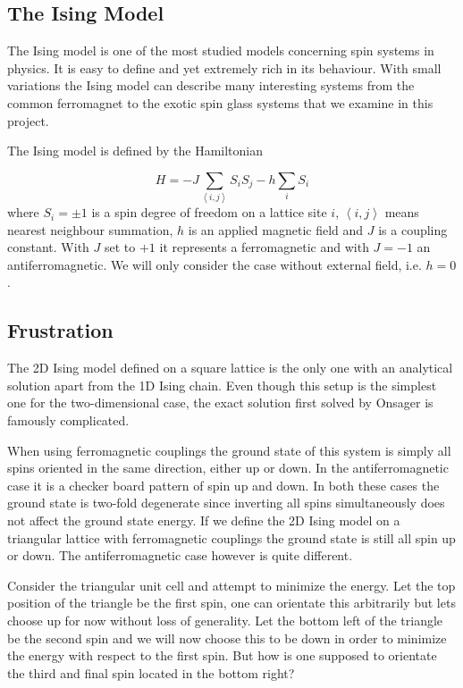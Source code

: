 \documentclass[paper=a4, fontsize=11pt]{scrartcl} %
\numberwithin{equation}{section} %
\numberwithin{figure}{section} %
\numberwithin{table}{section} %
\begin{document}
\subsection{The Ising Model}

The Ising model is one of the most studied models concerning spin systems in physics. It is easy to define and yet extremely rich in its behaviour. With small variations the Ising model can describe many interesting systems from the common ferromagnet to the exotic spin glass systems that we examine in this project.

The Ising model is defined by the Hamiltonian

\begin{equation}
H = -J \sum\limits_{\left\langle i,j \right\rangle} S_{i} S_{j} -h \sum\limits_{i} S_{i}
\end{equation}
where $S_{i} = \pm 1$ is a spin degree of freedom on a lattice site $i$, $\left< i,j \right> $ means nearest neighbour summation, $h$ is an applied magnetic field and $J$ is a coupling constant. With $J$ set to $+1$ it represents a ferromagnetic and with $J=-1$ an antiferromagnetic. We will only consider the case without external field, i.e. $h=0$.

\subsection{Frustration}
The 2D Ising model defined on a square lattice is the only one with an analytical solution apart from the 1D Ising chain. Even though this setup is the simplest one for the two-dimensional case, the exact solution first solved by Onsager is famously complicated\cite{onsager}.

When using ferromagnetic couplings the ground state of this system is simply all spins oriented in the same direction, either up or down. In the antiferromagnetic case it is a checker board pattern of spin up and down. In both these cases the ground state is two-fold degenerate since inverting all spins simultaneously does not affect the ground state energy. If we define the 2D Ising model on a triangular lattice with ferromagnetic couplings the ground state is still all spin up or down. The antiferromagnetic case however is quite different.

Consider the triangular unit cell and attempt to minimize the energy. Let the top position of the triangle be the first spin, one can orientate this arbitrarily but lets choose up for now without loss of generality. Let the bottom left of the triangle be the second spin and we will now choose this to be down in order to minimize the energy with respect to the first spin. But how is one supposed to orientate the third and final spin located in the bottom right? 
\end{document}
